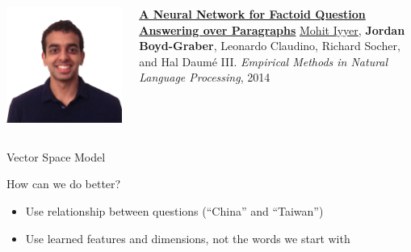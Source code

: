 \documentclass[compress]{beamer}
\newcommand{\gfxq}[2]{
\begin{center}
	\texttt{[image: qb/\#1]}
\end{center}
}
\begin{document}
\begin{frame}{}

  \begin{columns}
        \includegraphics[width=0.7\linewidth]{general_figures/mohit}
        \begin{block}{ {\bf \href{http://cs.colorado.edu/~jbg//docs/2014_emnlp_qb_rnn.pdf}{A Neural Network for Factoid Question Answering over Paragraphs}}}
\underline{\href{http://cs.umd.edu/~miyyer/}{Mohit Iyyer}}, {\bf Jordan Boyd-Graber}, Leonardo Claudino, Richard Socher, and Hal {Daum\'{e} III}.  \emph{Empirical Methods in Natural Language Processing}, 2014
        \end{block}


  \end{columns}
\end{frame}


\begin{frame}{Vector Space Model}

  \only<1>{\gfxq{unigram_models_0}{.8}}
  \only<2>{\gfxq{unigram_models_1}{.8}}
  \only<3>{\gfxq{unigram_models_2}{.8}}
  \only<4>{\gfxq{unigram_models_3}{.8}}
  \only<5>{\gfxq{unigram_models_4}{.8}}
  \only<6>{\gfxq{unigram_models_5}{.8}}
  \only<7>{\gfxq{unigram_models_6}{.8}}
  \only<8>{\gfxq{unigram_models_7}{.8}}
  \only<9>{\gfxq{unigram_models_8}{.8}}


\end{frame}



\begin{frame}{How can we do better?}

  \begin{itemize}
    \item Use relationship between questions (``China'' and
      ``Taiwan'')
    \item Use learned features and dimensions, not the words we start with
  \end{itemize}

\end{frame}
\end{document}
